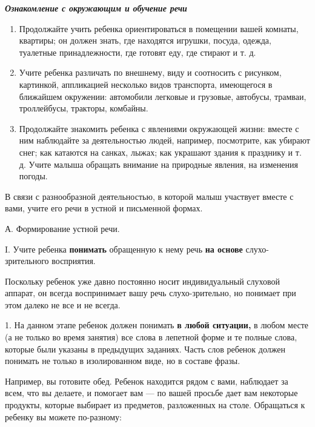 \documentclass[a5paper]{book}
\renewcommand{\emph}[1]{\textit{#1}}
\begin{document}
\emph{\textbf{Ознакомление с окружающим и обучение речи}}


\begin{enumerate}
\def\labelenumi{\arabic{enumi}.}
\item
  
  Продолжайте учить ребенка ориентироваться в помещении вашей комнаты,
  квартиры; он должен знать, где находятся игрушки, посуда, одежда,
  туалетные принадлежности, где готовят еду, где стирают и т. д.
  
\item
  
  Учите ребенка различать по внешнему, виду и соотносить с рисунком,
  картинкой, аппликацией несколько видов транспорта, имеющегося в
  ближайшем окружении: автомобили легковые и грузовые, автобусы,
  трамваи, троллейбусы, тракторы, комбайны.
  
\item
  
  Продолжайте знакомить ребенка с явлениями окружающей жизни: вместе с
  ним наблюдайте за деятельностью людей, например, посмотрите, как
  убирают снег; как катаются на санках, лыжах; как украшают здания к
  празднику и т. д. Учите малыша обращать внимание на природные явления,
  на изменения погоды.
  
\end{enumerate}


В связи с разнообразной деятельностью, в которой малыш участвует вместе
с вами, учите его речи в устной и письменной формах.

А. Формирование устной речи.

I. Учите ребенка \textbf{понимать} обращенную к нему речь \textbf{на
основе} слухо-зрительного восприятия.

Поскольку ребенок уже давно постоянно носит индивидуальный слуховой
аппарат, он всегда воспринимает вашу речь слухо-зрительно, но понимает
при этом далеко не все и не всегда.

1. На данном этапе ребенок должен понимать \textbf{в любой ситуации,} в
любом месте (а не только во время занятия) все слова в лепетной форме и
те полные слова, которые были указаны в предыдущих заданиях. Часть слов
ребенок должен понимать не только в изолированном виде, но в составе
фразы.

Например, вы готовите обед. Ребенок находится рядом с вами, наблюдает за
всем, что вы делаете, и помогает вам --- по вашей просьбе дает вам
некоторые продукты, которые выбирает из предметов, разложенных на столе.
Обращаться к ребенку вы можете по-разному:
\end{document}

